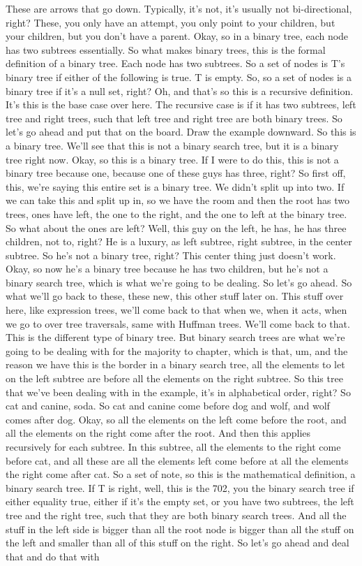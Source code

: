  
 These are arrows that go down. Typically, it's not, it's usually not bi-directional, right? These, you only have an attempt, you only point to your children, but your children, but you don't have a parent. Okay, so in a binary tree, each node has two subtrees essentially. So what makes binary trees, this is the formal definition of a binary tree. Each node has two subtrees. So a set of nodes is T's binary tree if either of the following is true. T is empty. So, so a set of nodes is a binary tree if it's a null set, right? Oh, and that's so this is a recursive definition. It's this is the base case over here. The recursive case is if it has two subtrees, left tree and right trees, such that left tree and right tree are both binary trees. So let's go ahead and put that on the board. Draw the example downward. So this is a binary tree. We'll see that this is not a binary search tree, but it is a binary tree right now. Okay, so this is a binary tree. If I were to do this, this is not a binary tree because one, because one of these guys has three, right? So first off, this, we're saying this entire set is a binary tree. We didn't split up into two. If we can take this and split up in, so we have the room and then the root has two trees, ones have left, the one to the right, and the one to left at the binary tree. So what about the ones are left? Well, this guy on the left, he has, he has three children, not to, right? He is a luxury, as left subtree, right subtree, in the center subtree. So he's not a binary tree, right? This center thing just doesn't work. Okay, so now he's a binary tree because he has two children, but he's not a binary search tree, which is what we're going to be dealing. So let's go ahead. So what we'll go back to these, these new, this other stuff later on. This stuff over here, like expression trees, we'll come back to that when we, when it acts, when we go to over tree traversals, same with Huffman trees. We'll come back to that. This is the different type of binary tree. But binary search trees are what we're going to be dealing with for the majority to chapter, which is that, um, and the reason we have this is the border in a binary search tree, all the elements to let on the left subtree are before all the elements on the right subtree. So this tree that we've been dealing with in the example, it's in alphabetical order, right? So cat and canine, soda. So cat and canine come before dog and wolf, and wolf comes after dog. Okay, so all the elements on the left come before the root, and all the elements on the right come after the root. And then this applies recursively for each subtree. In this subtree, all the elements to the right come before cat, and all these are all the elements left come before at all the elements the right come after cat. So a set of note, so this is the mathematical definition, a binary search tree. If T is right, well, this is the 702, you the binary search tree if either equality true, either if it's the empty set, or you have two subtrees, the left tree and the right tree, such that they are both binary search trees. And all the stuff in the left side is bigger than all the root node is bigger than all the stuff on the left and smaller than all of this stuff on the right. So let's go ahead and deal that and do that with 